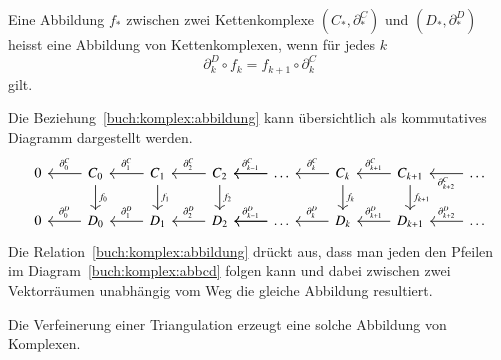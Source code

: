 \begin{definition}
Eine Abbildung $f_*$ zwischen zwei Kettenkomplexe $(C_*,\partial^C_*)$ und 
$(D_*,\partial^D_*)$ heisst eine Abbildung von Kettenkomplexen, wenn
für jedes $k$ 
\begin{equation}
\partial^D_k
\circ
f_{k}
=
f_{k+1}
\circ
\partial^C_k
\label{buch:komplex:abbildung}
\end{equation}
gilt.
\end{definition}

Die Beziehung~\eqref{buch:komplex:abbildung} kann übersichtlich als
kommutatives Diagramm dargestellt werden.
\begin{equation}
\begin{tikzcd}
0 
	& C_0 \arrow[l, "\partial_0^C" above]
		\arrow[d, "f_0"]
		& C_1 \arrow[l,"\partial_1^C" above]
			\arrow[d, "f_1"]
			& C_2 \arrow[l,"\partial_2^C" above]
				\arrow[d, "f_2"]
				& \dots \arrow[l]
					\arrow[l, "\partial_{k-1}^C" above]
					& C_k
						\arrow[l, "\partial_k^C" above]
						\arrow[d, "f_k"]
						& C_{k+1}\arrow[l, "\partial_{k+1}^C" above]
							\arrow[d, "f_{k+1}"]
							& \dots
								\arrow[l,"\partial_{k+2}^C"]
\\
0 
	& D_0 \arrow[l, "\partial_0^D" above]
		& D_1 \arrow[l,"\partial_1^D" above]
			& D_2 \arrow[l,"\partial_2^D" above]
				& \dots \arrow[l]
					\arrow[l, "\partial_{k-1}^D" above]
					& D_k
						\arrow[l, "\partial_k^D" above]
						& D_{k+1}\arrow[l, "\partial_{k+1}^D" above]
							& \dots
								\arrow[l,"\partial_{k+2}^D" above]
\end{tikzcd}
\label{buch:komplex:abbcd}
\end{equation}
Die Relation~\eqref{buch:komplex:abbildung} drückt aus, dass man jeden
den Pfeilen im Diagram~\eqref{buch:komplex:abbcd} folgen kann und
dabei zwischen zwei Vektorräumen unabhängig vom Weg die gleiche Abbildung
resultiert.

Die Verfeinerung einer Triangulation erzeugt eine solche Abbildung von
Komplexen.



